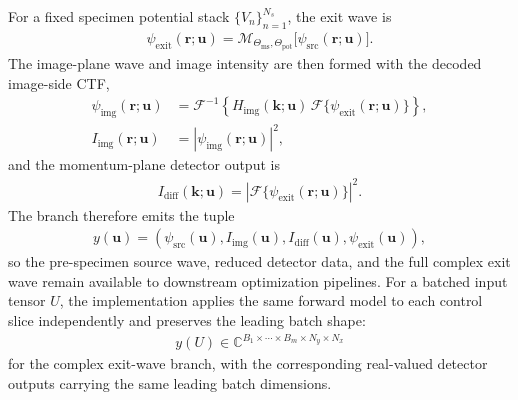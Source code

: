 \documentclass[11pt]{article}
\begin{document}
For a fixed specimen potential stack $\{V_n\}_{n=1}^{N_s}$, the exit wave is
\begin{align}
  \psi_{\mathrm{exit}}(\mathbf{r};\mathbf{u})
  =
  \mathcal{M}_{\Theta_{\mathrm{ms}},\Theta_{\mathrm{pot}}}
  \bigl[\psi_{\mathrm{src}}(\mathbf{r};\mathbf{u})\bigr].
\end{align}
The image-plane wave and image intensity are then formed with the decoded image-side CTF,
\begin{align}
  \psi_{\mathrm{img}}(\mathbf{r};\mathbf{u})
  &=
  \mathcal{F}^{-1}\!\left\{
    H_{\mathrm{img}}(\mathbf{k};\mathbf{u})\,
    \mathcal{F}\{\psi_{\mathrm{exit}}(\mathbf{r};\mathbf{u})\}
  \right\}, \\
  I_{\mathrm{img}}(\mathbf{r};\mathbf{u})
  &= \left|\psi_{\mathrm{img}}(\mathbf{r};\mathbf{u})\right|^2,
\end{align}
and the momentum-plane detector output is
\begin{align}
  I_{\mathrm{diff}}(\mathbf{k};\mathbf{u})
  = \left|\mathcal{F}\{\psi_{\mathrm{exit}}(\mathbf{r};\mathbf{u})\}\right|^2.
\end{align}
The branch therefore emits the tuple
\begin{align}
  y(\mathbf{u}) =
  \left(
    \psi_{\mathrm{src}}(\mathbf{u}),
    I_{\mathrm{img}}(\mathbf{u}),
    I_{\mathrm{diff}}(\mathbf{u}),
    \psi_{\mathrm{exit}}(\mathbf{u})
  \right),
\end{align}
so the pre-specimen source wave, reduced detector data, and the full complex exit wave
remain available to downstream optimization pipelines.
For a batched input tensor $U$, the implementation applies the same forward model to
each control slice independently and preserves the leading batch shape:
\begin{align}
  y(U)
  \in
  \mathbb{C}^{B_1\times\cdots\times B_m\times N_y\times N_x}
\end{align}
for the complex exit-wave branch, with the corresponding real-valued detector outputs
carrying the same leading batch dimensions.
\end{document}

